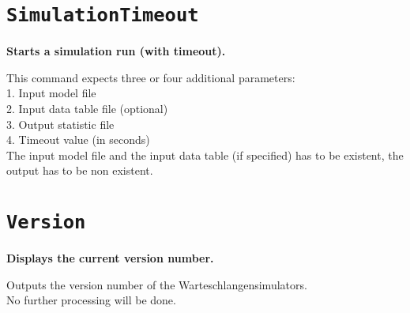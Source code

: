 \section{\texttt{SimulationTimeout}}

\textbf{Starts a simulation run (with timeout).}

This command expects three or four additional parameters:\\
1. Input model file\\
2. Input data table file (optional)\\
3. Output statistic file\\
4. Timeout value (in seconds)\\
The input model file and the input data table (if specified) has to be existent, the output has to be non existent.

\section{\texttt{Version}}

\textbf{Displays the current version number.}

Outputs the version number of the Warteschlangensimulators.\\
No further processing will be done.

